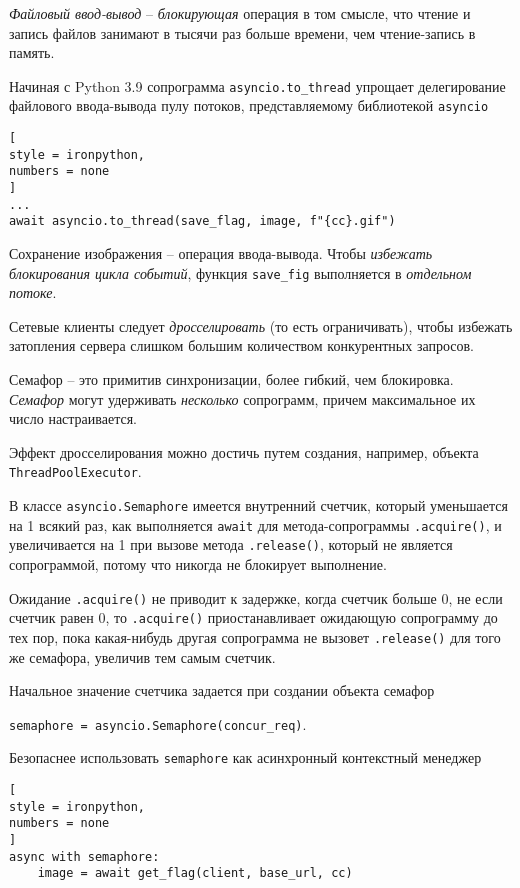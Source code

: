 \documentclass[%
	11pt,
	a4paper,
	utf8,
		]{article}
\begin{document}
\emph{Файловый ввод-вывод} -- \emph{блокирующая} операция в том смысле, что чтение и запись файлов занимают в тысячи раз больше времени, чем чтение-запись в память. 

Начиная с Python 3.9 сопрограмма \verb*|asyncio.to_thread| упрощает делегирование файлового ввода-вывода пулу потоков, представляемому библиотекой \verb|asyncio|
\begin{lstlisting}[
style = ironpython,
numbers = none
]
...
await asyncio.to_thread(save_flag, image, f"{cc}.gif")
\end{lstlisting}

Сохранение изображения -- операция ввода-вывода. Чтобы \emph{избежать блокирования цикла событий}, функция \verb*|save_fig| выполняется в \emph{отдельном потоке}.

Сетевые клиенты следует \emph{дросселировать} (то есть ограничивать), чтобы избежать затопления сервера слишком большим количеством конкурентных запросов. 

Семафор -- это примитив синхронизации, более гибкий, чем блокировка. \emph{Семафор} могут удерживать \emph{несколько} сопрограмм, причем максимальное их число настраивается. 

Эффект дросселирования можно достичь путем создания, например, объекта \verb|ThreadPoolExecutor|.

В классе \verb*|asyncio.Semaphore| имеется внутренний счетчик, который уменьшается на 1 всякий раз, как выполняется \verb|await| для метода-сопрограммы \verb*|.acquire()|, и увеличивается на 1 при вызове метода \verb|.release()|, который не является сопрограммой, потому что никогда не блокирует выполнение.

Ожидание \verb*|.acquire()| не приводит к задержке, когда счетчик больше 0, не если счетчик равен 0, то  \verb|.acquire()| приостанавливает ожидающую сопрограмму до тех пор, пока какая-нибудь другая сопрограмма не вызовет \verb*|.release()| для того же семафора, увеличив тем самым счетчик.

Начальное значение счетчика задается при создании объекта семафор

\noindent\verb|semaphore = asyncio.Semaphore(concur_req)|.

Безопаснее использовать \verb|semaphore| как асинхронный контекстный менеджер
\begin{lstlisting}[
style = ironpython,
numbers = none
]
async with semaphore:
    image = await get_flag(client, base_url, cc)
\end{lstlisting}
\end{document}
